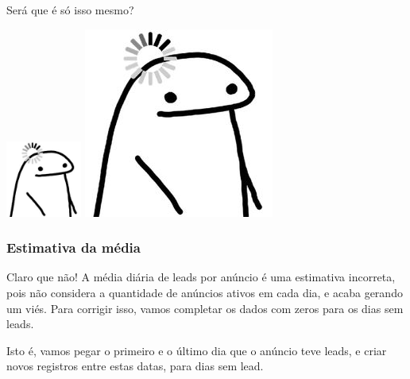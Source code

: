 \documentclass[
]{article}
\let\oldincludegraphics\includegraphics
\renewcommand{\includegraphics}[2][]{ \ifthenelse{ \equal{#1}{} } { \oldincludegraphics[width=2.5cm,height=2.5cm,keepaspectratio=true]{#2} } { \oldincludegraphics[#1]{#2} } }
\begin{document}
Será que é só isso mesmo?

\includegraphics{./images/loading-brain.jpg}

\subsubsection{Estimativa da média}\label{estimativa-da-muxe9dia}

Claro que não! A média diária de leads por anúncio é uma estimativa
incorreta, pois não considera a quantidade de anúncios ativos em cada
dia, e acaba gerando um viés. Para corrigir isso, vamos completar os
dados com zeros para os dias sem leads.

Isto é, vamos pegar o primeiro e o último dia que o anúncio teve leads,
e criar novos registros entre estas datas, para dias sem lead.
\end{document}
